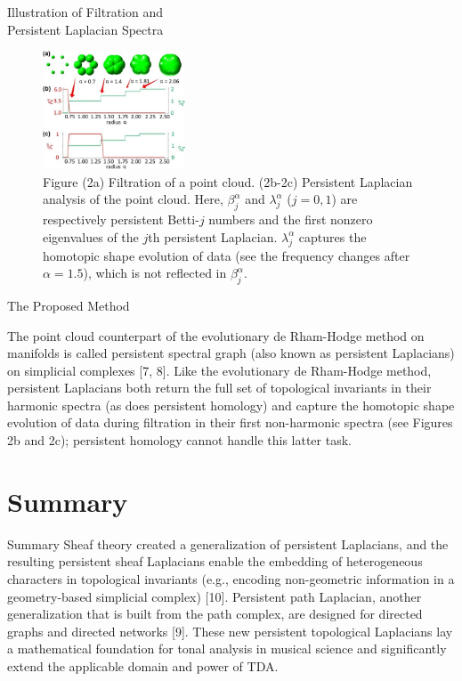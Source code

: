\documentclass[aspectratio=169,xcolor=dvipsnames]{beamer}
\begin{document}
\begin{frame}{Illustration of Filtration and \\Persistent Laplacian Spectra}
\begin{figure}[!ht]
\label{filtration}
 \centering
 \includegraphics[width=120pt]{images/filtration.jpeg}
 \caption{Figure (2a) Filtration of a point cloud. (2b-2c) Persistent Laplacian analysis of the point cloud. Here, $\beta^{\alpha}_{j}$ and $\lambda^{\alpha}_{j}$ ($j=0,1$) are respectively persistent Betti-$j$ numbers and the first nonzero eigenvalues of the $j$th persistent Laplacian. $\lambda^{\alpha}_{j}$ captures the homotopic shape evolution of data (see the frequency changes after $\alpha=1.5$), which is not reflected in $\beta^{\alpha}_{j}$.}
 \end{figure}
\end{frame}


\begin{frame}{The Proposed Method}
\begin{small}
    The point cloud counterpart of the evolutionary de Rham-Hodge method on manifolds is called persistent spectral graph (also known as persistent Laplacians) on simplicial complexes [7, 8]. Like the evolutionary de Rham-Hodge method, persistent Laplacians both return the full set of topological invariants in their harmonic spectra (as does persistent homology) and capture the homotopic shape evolution of data during filtration in their first non-harmonic spectra (see Figures 2b and 2c); persistent homology cannot handle this latter task.
    \end{small}
\end{frame}

\section{Summary}
\begin{frame}{Summary}
    Sheaf theory created a generalization of persistent Laplacians, and the resulting persistent sheaf Laplacians enable the embedding of heterogeneous characters in topological invariants (e.g., encoding non-geometric information in a geometry-based simplicial complex) [10]. Persistent path Laplacian, another generalization that is built from the path complex, are designed for directed graphs and directed networks [9]. These new persistent topological Laplacians lay a mathematical foundation for tonal analysis in musical science and significantly extend the applicable domain and power of TDA.
\end{frame}
\end{document}
